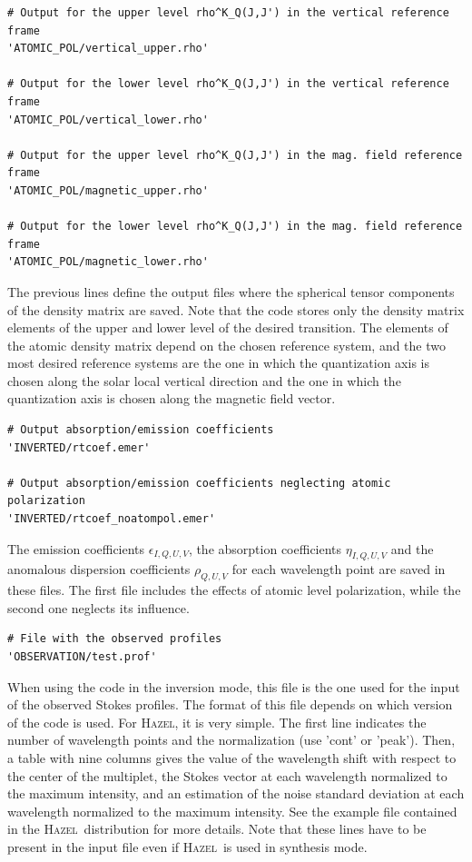 \documentclass[12pt]{article}
\def\H{\textsc{Hazel}}
\begin{document}
\begin{verbatim}
# Output for the upper level rho^K_Q(J,J') in the vertical reference frame
'ATOMIC_POL/vertical_upper.rho'

# Output for the lower level rho^K_Q(J,J') in the vertical reference frame
'ATOMIC_POL/vertical_lower.rho'

# Output for the upper level rho^K_Q(J,J') in the mag. field reference frame
'ATOMIC_POL/magnetic_upper.rho'

# Output for the lower level rho^K_Q(J,J') in the mag. field reference frame
'ATOMIC_POL/magnetic_lower.rho'
\end{verbatim}
The previous lines define the output files where the spherical tensor components of the
density matrix are saved. Note that the code stores only the density matrix elements of the upper and
lower level of the desired transition. The elements of the atomic density matrix depend on the chosen
reference system, and the two most desired reference systems are the one in which the
quantization axis is chosen along the solar local vertical direction and the one
in which the quantization axis is chosen along the magnetic field vector.

\begin{verbatim}
# Output absorption/emission coefficients
'INVERTED/rtcoef.emer'

# Output absorption/emission coefficients neglecting atomic polarization
'INVERTED/rtcoef_noatompol.emer'
\end{verbatim}
The emission coefficients $\epsilon_{I,Q,U,V}$, the absorption coefficients $\eta_{I,Q,U,V}$ and the anomalous
dispersion coefficients $\rho_{Q,U,V}$ for each wavelength point are saved in these files. The first file includes
the effects of atomic level polarization, while the second one neglects its influence.

\begin{verbatim}
# File with the observed profiles
'OBSERVATION/test.prof'
\end{verbatim}
When using the code in the inversion mode, this file is the one used for the input
of the observed Stokes profiles. The format of this file depends on which version of
the code is used. For \H, it is very simple. The first line
indicates the number of wavelength points and the normalization (use 'cont' or 'peak'). Then, a table with nine columns gives the value
of the wavelength shift with respect to the center of the multiplet, the Stokes vector
at each wavelength normalized to the maximum intensity, and an estimation of the noise standard deviation at each wavelength
normalized to the maximum intensity. See the example file contained in the \H\ distribution for more details.
Note that these lines have to be present in the input file even if \H\ is used in synthesis mode.
\end{document}
